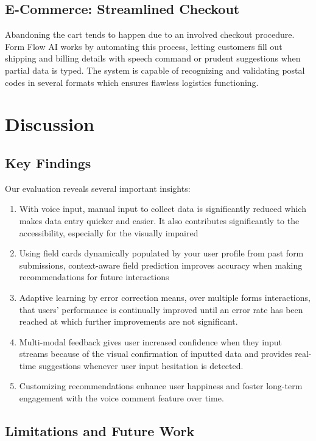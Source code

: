 \documentclass[conference]{IEEEtran}
\begin{document}
\subsection{E-Commerce: Streamlined Checkout}

Abandoning the cart tends to happen due to an involved checkout procedure. Form Flow AI works by automating this process, letting customers fill out shipping and billing details with speech command or prudent suggestions when partial data is typed. The system is capable of recognizing and validating postal codes in several formats which ensures flawless logistics functioning.


\section{Discussion}

\subsection{Key Findings}

Our evaluation reveals several important insights:

\begin{enumerate}
\item With voice input, manual input to collect data is significantly reduced which makes data entry quicker and easier. It also contributes significantly to the accessibility, especially for the visually impaired
\item Using field cards dynamically populated by your user profile from past form submissions, context-aware field prediction improves accuracy when making recommendations for future interactions
\item Adaptive learning by error correction means, over multiple forms interactions, that users' performance is continually improved until an error rate has been reached at which further improvements are not significant.
\item Multi-modal feedback gives user increased confidence when they input streams because of the visual confirmation of inputted data and provides real-time suggestions whenever user input hesitation is detected.
\item Customizing recommendations enhance user happiness and foster long-term engagement with the voice comment feature over time.
\end{enumerate}

\subsection{Limitations and Future Work}
\end{document}
